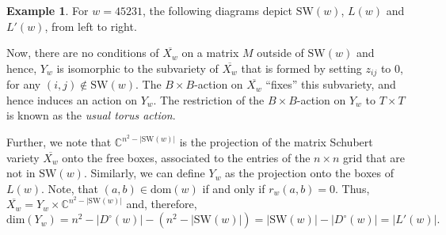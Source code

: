 \documentclass[11pt]{amsart}
\theoremstyle{definition}
\newtheorem{example}[theorem]{Example}
\theoremstyle{definition}
\theoremstyle{definition}
\theoremstyle{definition}
\newcommand{\Xw}{\overline{X_w}}
\newcommand{\SW}{\mathrm{SW}}
\newcommand{\dom}{\mathrm{dom}}
\newcommand{\Dc}{D^{\circ}}
\begin{document}
\begin{example}
    \noindent For $w=45231$, the following diagrams depict $\SW(w)$, $L(w)$ and $L'(w)$, from left to right.

\begin{center}
\qquad
{}
\qquad
{}
\end{center}
    \end{example}

\noindent Now, there are no conditions of $\overline{X_w}$ on a matrix $M$ outside of $\SW(w)$ and hence, $Y_w$ is isomorphic to the subvariety of $\overline{X_w}$ that is formed by setting $z_{ij}$ to $0$, for any $(i,j) \notin \text{SW}(w)$. The $B\times B$-action on $\overline{X_w}$ ``fixes'' this subvariety, and hence induces an action on $Y_w$. The restriction of the $B\times B$-action on $Y_w$ to $T\times T$ is known as the \textit{usual torus action}.

\noindent
Further, we note that $\mathbb{C}^{n^2-|\SW(w)|}$ is the projection of the matrix Schubert variety $\Xw$ onto the free boxes, associated to the entries of the $n\times n$ grid that are not in $\SW(w)$. Similarly, we can define $Y_w$ as the projection onto the boxes of $L(w)$. 
Note, that $(a,b) \in \dom(w)$ if and only if $r_w(a,b)=0$. Thus, $\Xw = Y_w \times \mathbb{C}^{n^2-|\SW(w)|}$ and, therefore,
$$\text{dim}(Y_w) = n^2 - |\Dc(w)| - (n^2 - |\SW(w)|) = |\SW(w)| - |\Dc(w)| = |L'(w)|.$$
\end{document}
